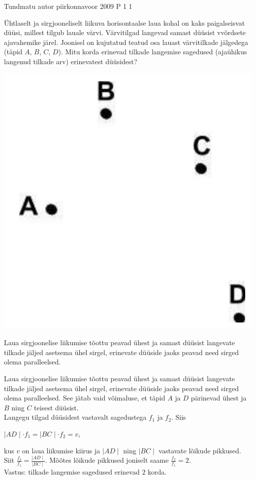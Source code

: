 {Tundmatu autor} %
{piirkonnavoor} %
{2009} %
{P 1} %
{1} %
{

\ifStatement
Ühtlaselt ja sirgjooneliselt liikuva horisontaalse laua kohal on kaks paigalseisvat düüsi, millest tilgub lauale värvi. Värvitilgad langevad samast düüsist vvõrdsete ajavahemike järel. Joonisel on kujutatud teatud osa lauast värvitilkade jälgedega (täpid $A$, $B$, $C$, $D$). Mitu korda erinevad tilkade langemise sagedused (ajaühikus langenud tilkade arv) erinevatest düüsidest?
\begin{center}
	\includegraphics[width=0.5\linewidth]{2009-v2p-01-yl.PNG}
\end{center}
\fi

\ifHint
Laua sirgjoonelise liikumise tõottu peavad ühest ja samast düüsist langevate tilkade jäljed asetsema ühel sirgel, erinevate düüside jaoks peavad need sirged olema paralleelsed.
\fi

\ifSolution
Laua sirgjoonelise liikumise tõottu peavad ühest ja samast düüsist langevate tilkade jäljed asetsema ühel sirgel, erinevate düüside jaoks peavad need sirged olema paralleelsed. See jätab vaid võimaluse, et täpid $A$ ja $D$ pärinevad ühest ja $B$ ning $C$ teisest düüsist. \\
Langegu tilgad düüsidest vastavalt sagedustega $f_1$ ja $f_2$. Siis 
\begin{center}
$\mid AD \mid \cdot f_1 = \mid BC \mid \cdot f_2 = v$,
\end{center}
kus $v$ on laua liikumise kiirus ja $ \mid AD \mid$ ning $\mid BC \mid$ vastavate lõikude pikkused. Siit $\frac{f_2}{f_1} = \frac{\mid AD\mid}{\mid BC \mid}$. Mõõtes lõikude pikkused joniselt saame $\frac{f_2}{f_1} = 2$. \\
Vastus: tilkade langemise sagedused erinevad $2$ korda.
\fi
}